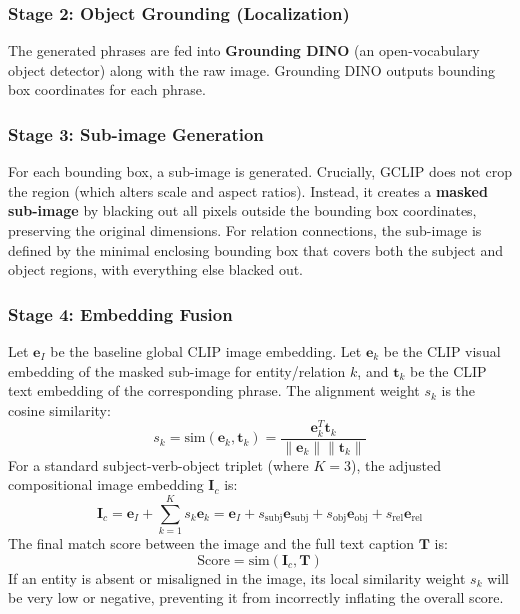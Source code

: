 \documentclass[11pt,a4paper]{article}
\begin{document}
\subsubsection{Stage 2: Object Grounding (Localization)}
The generated phrases are fed into \textbf{Grounding DINO} (an open-vocabulary object detector) along with the raw image. Grounding DINO outputs bounding box coordinates for each phrase.

\subsubsection{Stage 3: Sub-image Generation}
For each bounding box, a sub-image is generated. Crucially, GCLIP does not crop the region (which alters scale and aspect ratios). Instead, it creates a \textbf{masked sub-image} by blacking out all pixels outside the bounding box coordinates, preserving the original dimensions. For relation connections, the sub-image is defined by the minimal enclosing bounding box that covers both the subject and object regions, with everything else blacked out.

\subsubsection{Stage 4: Embedding Fusion}
Let $\bm{e}_I$ be the baseline global CLIP image embedding. Let $\bm{e}_k$ be the CLIP visual embedding of the masked sub-image for entity/relation $k$, and $\bm{t}_k$ be the CLIP text embedding of the corresponding phrase. The alignment weight $s_k$ is the cosine similarity:
\begin{equation}
s_k = \text{sim}(\bm{e}_k, \bm{t}_k) = \frac{\bm{e}_k^T \bm{t}_k}{\|\bm{e}_k\| \|\bm{t}_k\|}
\end{equation}
For a standard subject-verb-object triplet (where $K=3$), the adjusted compositional image embedding $\bm{I}_c$ is:
\begin{equation}
\bm{I}_c = \bm{e}_I + \sum_{k=1}^K s_k \bm{e}_k = \bm{e}_I + s_{\text{subj}}\bm{e}_{\text{subj}} + s_{\text{obj}}\bm{e}_{\text{obj}} + s_{\text{rel}}\bm{e}_{\text{rel}}
\end{equation}
The final match score between the image and the full text caption $\bm{T}$ is:
\begin{equation}
\text{Score} = \text{sim}(\bm{I}_c, \bm{T})
\end{equation}
If an entity is absent or misaligned in the image, its local similarity weight $s_k$ will be very low or negative, preventing it from incorrectly inflating the overall score.
\end{document}
